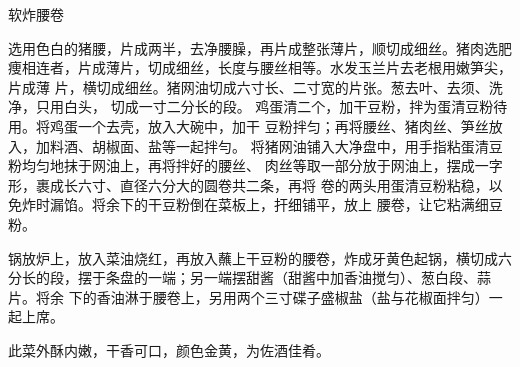 \begin{recipe}{软炸腰卷}

\ingredients


\cooking

\step 选用色白的猪腰，片成两半，去净腰臊，再片成整张薄片，顺切成细丝。猪肉选肥
痩相连者，片成薄片，切成细丝，长度与腰丝相等。水发玉兰片去老根用嫩笋尖，片成薄
片，横切成细丝。猪网油切成六寸长、二寸宽的片张。葱去叶、去须、洗净，只用白头，
切成一寸二分长的段。
\step 鸡蛋清二个，加干豆粉，拌为蛋清豆粉待用。将鸡蛋一个去壳，放入大碗中，加干
豆粉拌匀；再将腰丝、猪肉丝、笋丝放入，加料酒、胡椒面、盐等一起拌勻。
\step 将猪网油铺入大净盘中，用手指粘蛋清豆粉均匀地抹于网油上，再将拌好的腰丝、
肉丝等取一部分放于网油上，摆成一字形，裹成长六寸、直径六分大的圆卷共二条，再将
卷的两头用蛋清豆粉粘稳，以免炸时漏馅。将余下的干豆粉倒在菜板上，扞细铺平，放上
腰卷，让它粘满细豆粉。

\step 锅放炉上，放入菜油烧红，再放入蘸上干豆粉的腰卷，炸成牙黄色起锅，横切成六
分长的段，摆于条盘的一端；另一端摆甜酱（甜酱中加香油搅匀）、葱白段、蒜片。将余
下的香油淋于腰卷上，另用两个三寸碟子盛椒盐（盐与花椒面拌匀）一起上席。

\notes

此菜外酥内嫩，干香可口，颜色金黄，为佐酒佳肴。

\end{recipe}

